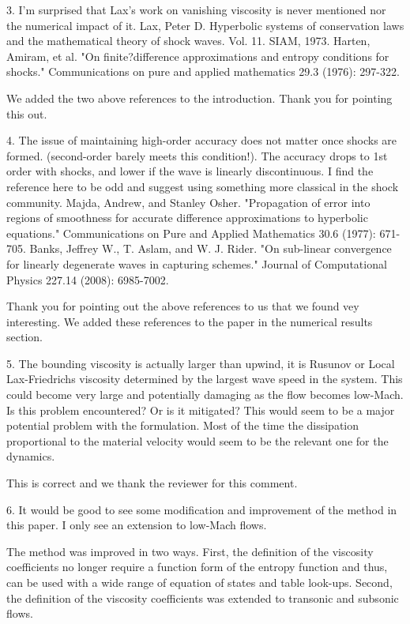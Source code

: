 \documentclass{article}
\begin{document}
\bigskip


{
\color{blue}
3. I'm surprised that Lax's work on vanishing viscosity is never mentioned
nor the numerical impact of it.
Lax, Peter D. Hyperbolic systems of conservation laws and the
mathematical theory of shock waves. Vol. 11. SIAM, 1973.
Harten, Amiram, et al. "On finite?difference approximations and entropy
conditions for shocks." Communications on pure and applied mathematics
29.3 (1976): 297-322. 
}

We added the two above references to the introduction. Thank you for pointing this out.
\bigskip


{
\color{blue}
4. The issue of maintaining high-order accuracy does not matter once
shocks are formed. (second-order barely meets this condition!). The
accuracy drops to 1st order with shocks, and lower if the wave is linearly
discontinuous. I find the reference here to be odd and suggest using
something more classical in the shock community.
Majda, Andrew, and Stanley Osher. "Propagation of error into regions of
smoothness for accurate difference approximations to hyperbolic
equations." Communications on Pure and Applied Mathematics 30.6
(1977): 671-705.
Banks, Jeffrey W., T. Aslam, and W. J. Rider. "On sub-linear convergence
for linearly degenerate waves in capturing schemes." Journal of
Computational Physics 227.14 (2008): 6985-7002.
}

Thank you for pointing out the above references to us that we found vey interesting. We added these references to the paper in the numerical results section.
\bigskip


{
\color{blue}
5. The bounding viscosity is actually larger than upwind, it is Rusunov or
Local Lax-Friedrichs viscosity determined by the largest wave speed in the
system. This could become very large and potentially damaging as the
flow becomes low-Mach. Is this problem encountered? Or is it mitigated?
This would seem to be a major potential problem with the formulation.
Most of the time the dissipation proportional to the material velocity
would seem to be the relevant one for the dynamics.
}

This is correct and we thank the reviewer for this comment.
\bigskip


{
\color{blue}
6. It would be good to see some modification and improvement of the
method in this paper. I only see an extension to low-Mach flows.
}

The method was improved in two ways. First, the definition of the viscosity coefficients no longer require a function form of the entropy function and thus, can be used with a wide range of equation of states and table look-ups. Second, the definition of the viscosity coefficients was extended to transonic and subsonic flows.
\bigskip
\end{document}
